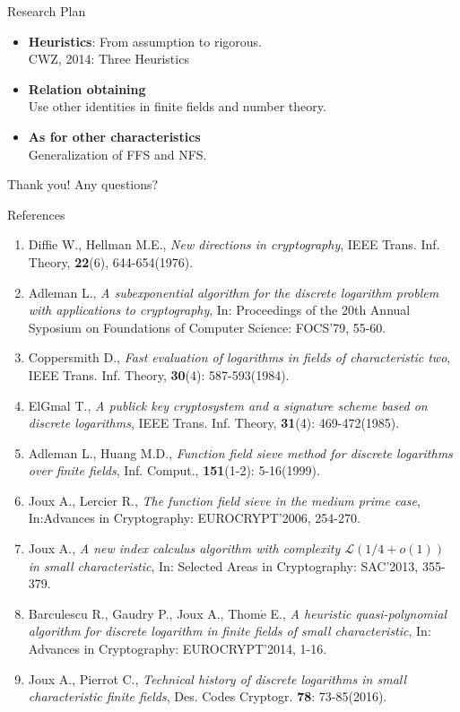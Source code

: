 \documentclass{beamer}
\begin{document}
	\begin{frame}{Research Plan}
		\begin{itemize}
			\item \textbf{Heuristics}: From assumption to rigorous.\\
				CWZ, 2014: Three Heuristics
				\pause
			\item \textbf{Relation obtaining}\\
				Use other identities in finite fields and number theory.
				\pause
			\item \textbf{As for other characteristics}\\
				Generalization of FFS and NFS.
		\end{itemize}
	\end{frame}
	
	\begin{frame}
		Thank you! Any questions?
	\end{frame}
	
	\begin{frame}{References}
		\tiny{\begin{enumerate}
			\item
				Diffie W., Hellman M.E., \emph{New directions in cryptography},
				IEEE Trans. Inf. Theory, \textbf{22}(6), 644-654(1976). 
			\item
				Adleman L., \emph{A subexponential algorithm for the discrete logarithm problem with applications to cryptography},
				In: Proceedings of the 20th Annual Syposium on Foundations of Computer Science: FOCS'79, 55-60.
			\item
				Coppersmith D., \emph{Fast evaluation of logarithms in fields of characteristic two},
				IEEE Trans. Inf. Theory, \textbf{30}(4): 587-593(1984).
			\item
				ElGmal T., \emph{A publick key cryptosystem and a signature scheme based on discrete logarithms},
				IEEE Trans. Inf. Theory, \textbf{31}(4): 469-472(1985).
			\item
				Adleman L., Huang M.D., \emph{Function field sieve method for discrete logarithms over finite fields},
				Inf. Comput., \textbf{151}(1-2): 5-16(1999).
			\item
				Joux A., Lercier R., \emph{The function field sieve in the medium prime case},
				In:Advances in Cryptography: EUROCRYPT'2006, 254-270.
			\item
				Joux A., \emph{A new index calculus algorithm with complexity $\mathcal{L}(1/4 + o(1))$ in small characteristic},
				In: Selected Areas in Cryptography: SAC'2013, 355-379.
			\item
				Barculescu R., Gaudry P., Joux A., Thom$\acute{\text{e}}$ E., \emph{A heuristic quasi-polynomial algorithm for discrete logarithm in finite fields of small characteristic}, In: Advances in Cryptography: EUROCRYPT'2014, 1-16.
			\item
				Joux A., Pierrot C., \emph{Technical history of discrete logarithms in small characteristic finite fields}, 
				Des. Codes Cryptogr. \textbf{78}: 73-85(2016).
			\end{enumerate}
			}
	\end{frame}
\end{document}
